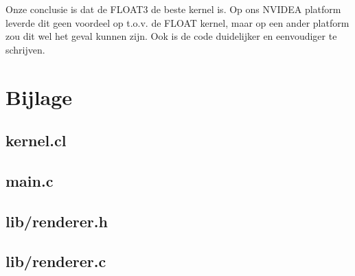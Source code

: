 \documentclass[a4paper]{article}
\begin{document}
Onze conclusie is dat de FLOAT3 de beste kernel is. Op ons NVIDEA platform leverde dit geen voordeel op t.o.v. de FLOAT kernel, maar op een ander platform zou dit wel het geval kunnen zijn. Ook is de code duidelijker en eenvoudiger te schrijven.

\newpage\section{Bijlage}

\subsection{kernel.cl}\label{bijlage:kernel}


\subsection{main.c}\label{bijlage:main}


\subsection{lib/renderer.h}\label{bijlage:lib_renderer_h}


\subsection{lib/renderer.c}\label{bijlage:lib_renderer_c}

\end{document}
